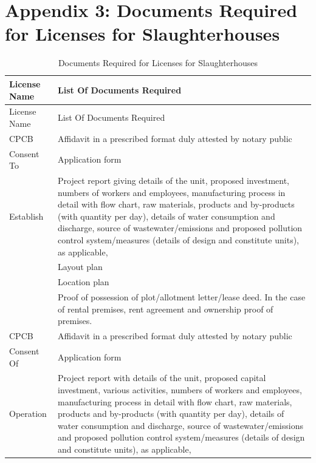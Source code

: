 \documentclass[a4paper, 12pt]{article}
\newcommand\tabitem{\makebox[1em][r]{\textbullet~}}
\begin{document}
\small
\newpage
\section*{Appendix 3: Documents Required for Licenses for Slaughterhouses}







\begin{longtable}{>{\raggedright}p{2.5cm}>{\raggedright\arraybackslash}p{13cm}}
\caption{Documents Required for Licenses for Slaughterhouses} \\
\toprule
   License Name & List Of Documents Required \\
    \midrule
    \endfirsthead 
     License Name & List Of Documents Required \\
     \midrule
     \endhead
    \endlastfoot
   CPCB  & \tabitem Affidavit in a prescribed format duly attested by notary public \\
   Consent  To  & \tabitem Application form \\
   Establish &  \tabitem Project report giving details of the unit, proposed investment, numbers of workers and employees, manufacturing process in detail with flow chart, raw materials, products and by-products (with quantity per day), details of water consumption and discharge, source of wastewater/emissions and proposed pollution control system/measures (details of design and constitute units), as applicable, \\
          & \tabitem Layout plan \\
          & \tabitem Location plan \\
          & \tabitem Proof of possession of plot/allotment letter/lease deed. In the case of rental premises, rent agreement and ownership proof of premises. \\
    \midrule
    CPCB  & \tabitem Affidavit in a prescribed format duly attested by notary public \\
    Consent Of  & \tabitem Application form \\
   Operation &  \tabitem Project report with details of the unit, proposed capital investment, various activities, numbers of workers and employees, manufacturing process in detail with flow chart, raw materials, products and by-products (with quantity per day), details of water consumption and discharge, source of wastewater/emissions and proposed pollution control system/measures (details of design and constitute units), as applicable, \\

\end{longtable}
\end{document}
